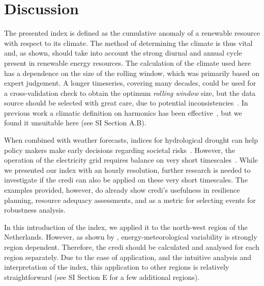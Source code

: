 \documentclass[12pt]{iopart}
\newcommand{\credi}[0]{{\sc credi}}
\begin{document}
\section{Discussion}\label{secCP2:discussion}
The presented index is defined as the cumulative anomaly of a renewable resource with respect to its climate. 
The method of determining the climate is thus vital and, as shown, should take into account the strong diurnal and annual cycle present in renewable energy resources. 
The calculation of the climate used here has a dependence on the size of the rolling window, which was primarily based on expert judgement. 
A longer timeseries, covering many decades, could be used for a cross-validation check to obtain the optimum \emph{rolling window} size, but the data source should be selected with great care, due to potential inconsistencies~\parencite{wohland2019significant,Wohland2022,Deser2023}. 
In previous work a climatic definition on harmonics has been effective~\parencite{Sabziparvar2014,Fischer2019,Rayson2021}, but we found it unsuitable here (see SI Section A.B). 

When combined with weather forecasts, indices for hydrological drought can help policy makers make early decisions regarding societal risks~\parencite{Quiring2009,Stagge2015,Cammalleri2021,vanderWiel2022}. 
However, the operation of the electricity grid requires balance on very short timescales~\parencite{craig2022disconnect,tennet2023}. 
While we presented our index with an hourly resolution, further research is needed to investigate if the \credi{} can also be applied on these very short timescales. 
The examples provided, however, do already show \credi's usefulness in resilience planning, resource adequacy assessments, and as a metric for selecting events for robustness analysis.

In this introduction of the index, we applied it to the north-west region of the Netherlands. 
However, as shown by \textcite{Pickering2020}, energy-meteorological variability is strongly region dependent. 
Therefore, the \credi{} should be calculated and analysed for each region separately. 
Due to the ease of application, and the intuitive analysis and interpretation of the index, this application to other regions is relatively straightforward (see SI Section E for a few additional regions). 
\end{document}
